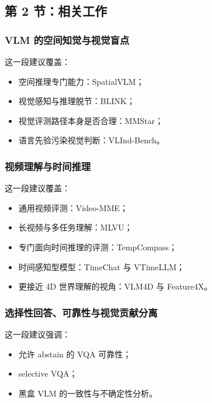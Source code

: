 \documentclass[UTF8,12pt,fontset=none]{ctexart}
\begin{document}
\subsection{第 2 节：相关工作}

\subsubsection{VLM 的空间知觉与视觉盲点}
这一段建议覆盖：
\begin{itemize}
  \item 空间推理专门能力：SpatialVLM\cite{chen2024spatialvlm}；
  \item 视觉感知与推理脱节：BLINK\cite{fu2024blink}；
  \item 视觉评测路径本身是否合理：MMStar\cite{chen2024mmstar}；
  \item 语言先验污染视觉判断：VLInd-Bench\cite{lee2025vlind}。
\end{itemize}

\subsubsection{视频理解与时间推理}
这一段建议覆盖：
\begin{itemize}
  \item 通用视频评测：Video-MME\cite{fu2024videomme}；
  \item 长视频与多任务理解：MLVU\cite{zhou2024mlvu}；
  \item 专门面向时间推理的评测：TempCompass\cite{liu2024tempcompass}；
  \item 时间感知型模型：TimeChat\cite{ren2024timechat} 与 VTimeLLM\cite{huang2024vtimellm}；
  \item 更接近 4D 世界理解的视角：VLM4D\cite{zhou2025vlm4d} 与 Feature4X\cite{zhou2025feature4x}。
\end{itemize}

\subsubsection{选择性回答、可靠性与视觉贡献分离}
这一段建议强调：
\begin{itemize}
  \item 允许 abstain 的 VQA 可靠性\cite{whitehead2022reliablevqa}；
  \item selective VQA\cite{eisenschlos2024selectivevqa}；
  \item 黑盒 VLM 的一致性与不确定性分析\cite{khan2024consistency}。
\end{itemize}
\end{document}
